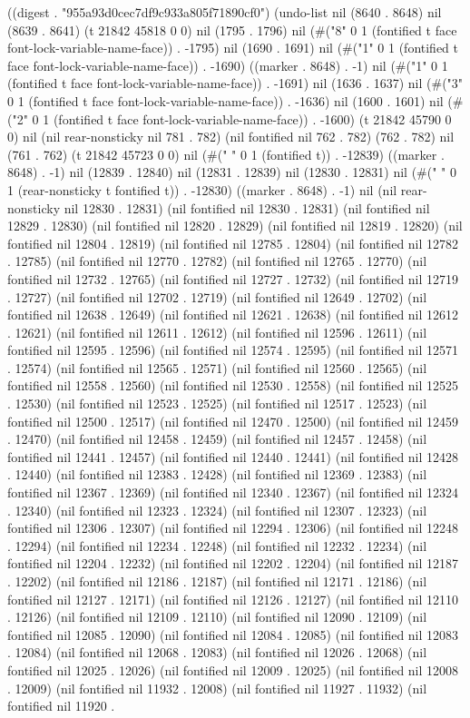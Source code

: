
((digest . "955a93d0cec7df9c933a805f71890cf0") (undo-list nil (8640 . 8648) nil (8639 . 8641) (t 21842 45818 0 0) nil (1795 . 1796) nil (#("8" 0 1 (fontified t face font-lock-variable-name-face)) . -1795) nil (1690 . 1691) nil (#("1" 0 1 (fontified t face font-lock-variable-name-face)) . -1690) ((marker . 8648) . -1) nil (#("1" 0 1 (fontified t face font-lock-variable-name-face)) . -1691) nil (1636 . 1637) nil (#("3" 0 1 (fontified t face font-lock-variable-name-face)) . -1636) nil (1600 . 1601) nil (#("2" 0 1 (fontified t face font-lock-variable-name-face)) . -1600) (t 21842 45790 0 0) nil (nil rear-nonsticky nil 781 . 782) (nil fontified nil 762 . 782) (762 . 782) nil (761 . 762) (t 21842 45723 0 0) nil (#("
" 0 1 (fontified t)) . -12839) ((marker . 8648) . -1) nil (12839 . 12840) nil (12831 . 12839) nil (12830 . 12831) nil (#(" " 0 1 (rear-nonsticky t fontified t)) . -12830) ((marker . 8648) . -1) nil (nil rear-nonsticky nil 12830 . 12831) (nil fontified nil 12830 . 12831) (nil fontified nil 12829 . 12830) (nil fontified nil 12820 . 12829) (nil fontified nil 12819 . 12820) (nil fontified nil 12804 . 12819) (nil fontified nil 12785 . 12804) (nil fontified nil 12782 . 12785) (nil fontified nil 12770 . 12782) (nil fontified nil 12765 . 12770) (nil fontified nil 12732 . 12765) (nil fontified nil 12727 . 12732) (nil fontified nil 12719 . 12727) (nil fontified nil 12702 . 12719) (nil fontified nil 12649 . 12702) (nil fontified nil 12638 . 12649) (nil fontified nil 12621 . 12638) (nil fontified nil 12612 . 12621) (nil fontified nil 12611 . 12612) (nil fontified nil 12596 . 12611) (nil fontified nil 12595 . 12596) (nil fontified nil 12574 . 12595) (nil fontified nil 12571 . 12574) (nil fontified nil 12565 . 12571) (nil fontified nil 12560 . 12565) (nil fontified nil 12558 . 12560) (nil fontified nil 12530 . 12558) (nil fontified nil 12525 . 12530) (nil fontified nil 12523 . 12525) (nil fontified nil 12517 . 12523) (nil fontified nil 12500 . 12517) (nil fontified nil 12470 . 12500) (nil fontified nil 12459 . 12470) (nil fontified nil 12458 . 12459) (nil fontified nil 12457 . 12458) (nil fontified nil 12441 . 12457) (nil fontified nil 12440 . 12441) (nil fontified nil 12428 . 12440) (nil fontified nil 12383 . 12428) (nil fontified nil 12369 . 12383) (nil fontified nil 12367 . 12369) (nil fontified nil 12340 . 12367) (nil fontified nil 12324 . 12340) (nil fontified nil 12323 . 12324) (nil fontified nil 12307 . 12323) (nil fontified nil 12306 . 12307) (nil fontified nil 12294 . 12306) (nil fontified nil 12248 . 12294) (nil fontified nil 12234 . 12248) (nil fontified nil 12232 . 12234) (nil fontified nil 12204 . 12232) (nil fontified nil 12202 . 12204) (nil fontified nil 12187 . 12202) (nil fontified nil 12186 . 12187) (nil fontified nil 12171 . 12186) (nil fontified nil 12127 . 12171) (nil fontified nil 12126 . 12127) (nil fontified nil 12110 . 12126) (nil fontified nil 12109 . 12110) (nil fontified nil 12090 . 12109) (nil fontified nil 12085 . 12090) (nil fontified nil 12084 . 12085) (nil fontified nil 12083 . 12084) (nil fontified nil 12068 . 12083) (nil fontified nil 12026 . 12068) (nil fontified nil 12025 . 12026) (nil fontified nil 12009 . 12025) (nil fontified nil 12008 . 12009) (nil fontified nil 11932 . 12008) (nil fontified nil 11927 . 11932) (nil fontified nil 11920 . 